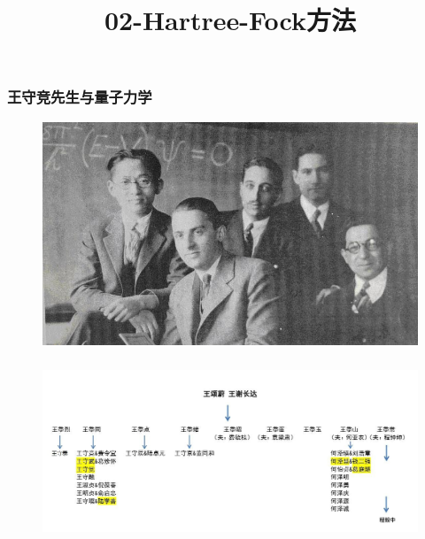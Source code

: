 {\frame
{
	\frametitle{王守竞先生与量子力学}
\begin{figure}[h!]
\centering
\vspace{-10.5pt}
\includegraphics[height=0.65\textwidth,width=1.0\textwidth,viewport=0 0 560 350,clip]{Figures/Collect_Wang.jpg}
\caption{\fontsize{7.2pt}{6.5pt}}
\label{Collect_Wang}
\end{figure}
}

\frame
{
	\frametitle{}
\begin{figure}[h!]
\centering
\hspace*{-10.5pt}
\includegraphics[height=0.42\textwidth,width=1.05\textwidth,viewport=0 0 860 350,clip]{Figures/Wang_Family_Suzhou.jpg}
\caption{\fontsize{6.2pt}{5.5pt}}
\label{Wang_Family}
\end{figure}
}

\title{02-{\rm Hartree-Fock}方法}
}
